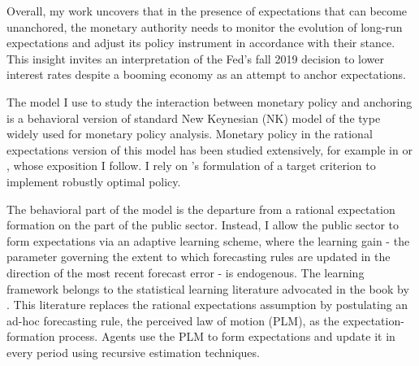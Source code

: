 \documentclass[11pt]{article}
\renewcommand{\[}{\begin{equation}}
\renewcommand{\]}{\end{equation}}
\begin{document}
Overall, my work uncovers that in the presence of expectations that can become unanchored, the monetary authority needs to monitor the evolution of long-run expectations and adjust its policy instrument in accordance with their stance. This insight invites an interpretation of the Fed's fall 2019 decision to lower interest rates despite a booming economy as an attempt to anchor expectations. 

The model I use to study the interaction between monetary policy and anchoring is a behavioral version of standard New Keynesian (NK) model of the type widely used for monetary policy analysis. Monetary policy in the rational expectations version of this model has been studied extensively, for example in \cite{clarida1999science} or \cite{woodford2011interest}, whose exposition I follow. I rely on \cite{svensson1999inflation}'s formulation of a target criterion to implement robustly optimal policy.

The behavioral part of the model is the departure from a rational expectation formation on the part of the public sector. Instead, I allow the public sector to form expectations via an adaptive learning scheme, where the learning gain - the parameter governing the extent to which forecasting rules are updated in the direction of the most recent forecast error - is endogenous. The learning framework belongs to the statistical learning literature advocated in the book by \cite{evans_honkapohja2001}. This literature replaces the rational expectations assumption by postulating an ad-hoc forecasting rule, the perceived law of motion (PLM), as the expectation-formation process. Agents use the PLM to form expectations and update it in every period using recursive estimation techniques. 

%
\end{document}
